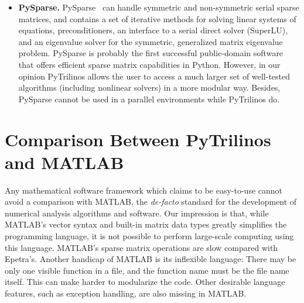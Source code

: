 \documentclass[10pt,relax]{SANDreport}
\begin{document}
\begin{itemize}
\item {\bf PySparse.}   PySparse~\cite{broker05using} can
  handle symmetric and non-symmetric serial sparse matrices, and contains a
  set of iterative methods for solving linear systems of equations,
  preconditioners, an interface to a serial direct solver (SuperLU), and an
  eigenvalue solver for the symmetric, generalized matrix eigenvalue problem.
  PySparse is probably the first successful public-domain software that offers
  efficient sparse matrix capabilities in Python. However, in our opinion
  PyTrilinos allows the user to access a much larger set of well-tested
  algorithms (including nonlinear solvers) 
  in a more modular way. Besides, PySparse cannot be used in a
  parallel environments while PyTrilinos do.

\end{itemize}

\section{Comparison Between PyTrilinos and MATLAB}
\label{sec:comparison_matlab}

Any mathematical software framework which
claims to be easy-to-use cannot avoid a comparison with MATLAB, the
{\sl de-facto} standard for the development of numerical analysis
algorithms and software. Our impression is that, while MATLAB's
vector syntax and built-in matrix data types greatly simplifies the
programming language, it is not possible to perform large-scale
computing using this language. MATLAB's sparse matrix operations are
slow compared with Epetra's. Another handicap of MATLAB is its
inflexible language: There may be only one visible function in a
file, and the function name must be the file name itself. This can
make harder to modularize the code.  Other desirable language
features, such as exception handling, are also missing in MATLAB.
\end{document}
